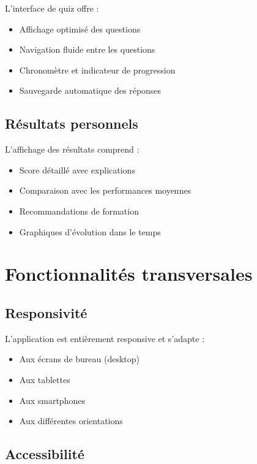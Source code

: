 \documentclass[12pt,a4paper]{report}
\begin{document}
L'interface de quiz offre :

\begin{itemize}
    \item Affichage optimisé des questions
    \item Navigation fluide entre les questions
    \item Chronomètre et indicateur de progression
    \item Sauvegarde automatique des réponses
\end{itemize}

\subsection{Résultats personnels}

L'affichage des résultats comprend :

\begin{itemize}
    \item Score détaillé avec explications
    \item Comparaison avec les performances moyennes
    \item Recommandations de formation
    \item Graphiques d'évolution dans le temps
\end{itemize}

\section{Fonctionnalités transversales}

\subsection{Responsivité}

L'application est entièrement responsive et s'adapte :

\begin{itemize}
    \item Aux écrans de bureau (desktop)
    \item Aux tablettes
    \item Aux smartphones
    \item Aux différentes orientations
\end{itemize}

\subsection{Accessibilité}
\end{document}
